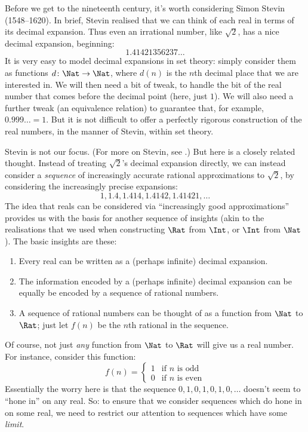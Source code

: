 Before we get to the nineteenth century, it's worth considering Simon
Stevin (1548--1620). In brief, Stevin realised that we can think of
each real in terms of its decimal expansion. Thus even an irrational
number, like $\sqrt{2}$, has a nice decimal expansion, beginning:
\[
	1.41421356237\ldots
\] 
It is very easy to model decimal expansions in set theory: simply
consider them as functions $d \colon \Nat \to \Nat$, where $d(n)$ is
the $n$th decimal place that we are interested in. We will then need a
bit of tweak, to handle the bit of the real number that comes before
the decimal point (here, just $1$). We will also need a further tweak
(an equivalence relation) to guarantee that, for example, $0.999\ldots
= 1$. But it is not difficult to offer a perfectly rigorous
construction of the real numbers, in the manner of Stevin, within set
theory. 

Stevin is not our focus. (For more on Stevin, see
\citealt{KatzKatz2012}.) But here is a closely related thought.
Instead of treating $\sqrt{2}$'s decimal expansion directly, we can
instead consider a  \emph{sequence} of increasingly accurate rational
approximations to $\sqrt{2}$, by considering the increasingly precise
expansions: 
\[
1, 1.4, 1.414, 1.4142, 1.41421,\ldots
\]
The idea that reals can be considered via ``increasingly good
approximations'' provides us with the basis for another sequence of
insights (akin to the realisations that we used when constructing
$\Rat$ from $\Int$, or $\Int$ from $\Nat$). The basic insights are
these:
\begin{enumerate}
	\item Every real can be written as a (perhaps infinite) decimal
	expansion.
	\item The information encoded by a (perhaps infinite) decimal
	expansion can be equally be encoded by a sequence of rational
	numbers.
	\item A sequence of rational numbers can be thought of as a
	function from $\Nat$ to $\Rat$; just let $f(n)$ be the $n$th
	rational in the sequence.
\end{enumerate}
Of course, not just \emph{any} function from $\Nat$ to $\Rat$ will
give us a real number. For instance, consider this function:
\[
	f(n) =\begin{cases}
			1 & \text{if }n\text{ is odd}\\
			0 &\text{if }n\text{ is even}
		\end{cases}
\]
Essentially the worry here is that the sequence $0,1,0,1,0,1,0,\ldots$
doesn't seem to ``hone in'' on any real. So: to ensure that we
consider sequences which do hone in on some real, we need to restrict
our attention to sequences which have some \emph{limit}. 

